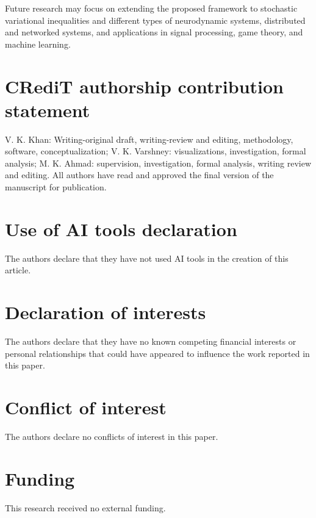 \documentclass{article}
\theoremstyle{plain}%
\theoremstyle{thmstyletwo}%
\theoremstyle{thmstylethree}%
\begin{document}
Future research may focus on extending the proposed framework to stochastic variational inequalities and different types of neurodynamic systems, distributed and networked systems, and applications in signal processing, game theory, and machine learning.



\section*{CRediT authorship contribution statement}
V. K. Khan: Writing-original draft, writing-review and editing, methodology, software, conceptualization; V. K. Varshney: visualizations, investigation, formal analysis; M. K. Ahmad: supervision, investigation, formal analysis, writing review and editing. All authors have read and approved the final version of the manuscript for publication.
\section*{Use of AI tools declaration}
The authors declare that they have not used AI tools in the creation of this article.
\section*{Declaration of interests} 
The authors declare that they have no known competing financial interests or personal relationships 
that could have appeared to influence the work reported in this paper.
\section*{Conflict of interest}
The authors declare no conflicts of interest in this paper.
\section*{Funding}
This research received no external funding.
\end{document}
